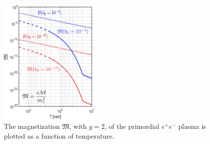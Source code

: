 \documentclass[reprint]{revtex4-2}
\begin{document}
\begin{figure}[ht]
    \centering
    \includegraphics[width=0.45\textwidth]{Magnetization_Hc_new004.png}
    \caption{The magnetization ${\mathfrak M}$, with $g=2$, of the primordial $e^{+}e^{-}$ plasma is plotted as a function of temperature.}
    \label{fig:magnet} 
\end{figure}
\end{document}
